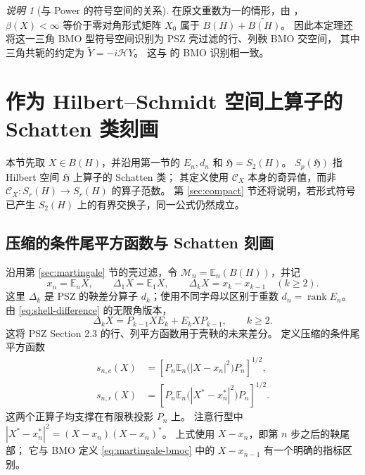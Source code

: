 \documentclass[UTF8,11pt,a4paper,fontset=fandol]{ctexart}
\theoremstyle{remark}
\newtheorem{remark}[theorem]{说明}
\newcommand{\TriH}{\mathcal H}
\newcommand{\CC}{\mathcal C}
\DeclareMathOperator{\rank}{rank}
\newcommand{\HS}{\mathfrak H}
\numberwithin{equation}{section}
\begin{document}
\begin{remark}[与 Power 的符号空间的关系]
在原文重数为一的情形，由 \cite[Theorem 2.3]{Power}，
$\beta(X)<\infty$ 等价于零对角形式矩阵
$X_0$ 属于 $B(H)+\widetilde{B(H)}$。
因此本定理还将这一三角 BMO 型符号空间识别为 PSZ 壳过滤的行、列鞅 BMO 交空间，
其中三角共轭的约定为 $\widetilde Y=-i\TriH Y$。
这与 \cite[Theorem 3.16]{PSZ} 的 BMO 识别相一致。
\end{remark}

\section{作为 Hilbert--Schmidt 空间上算子的 Schatten 类刻画}

本节先取 $X\in B(H)$，并沿用第一节的 $E_n,d_n$ 和 $\HS=S_2(H)$。
$S_p(\HS)$ 指 Hilbert 空间 $\HS$ 上算子的 Schatten 类；
其定义使用 $\CC_X$ 本身的奇异值，而非 $\CC_X:S_r(H)\to S_r(H)$ 的算子范数。
第 \ref{sec:compact} 节还将说明，若形式符号已产生 $S_2(H)$ 上的有界交换子，同一公式仍然成立。

\subsection{压缩的条件尾平方函数与 Schatten 刻画}

沿用第 \ref{sec:martingale} 节的壳过滤，令
$\mathcal M_n=\mathbb E_n(B(H))$，并记
\[
 x_n=\mathbb E_nX,\qquad
 \Delta_1X=\mathbb E_1X,\qquad
 \Delta_kX=x_k-x_{k-1}\quad(k\geq2).
\]
这里 $\Delta_k$ 是 PSZ 的鞅差分算子 $d_k$；使用不同字母以区别于重数
$d_n=\rank E_n$。由 \eqref{eq:shell-difference} 的无限角版本，
\begin{equation}\label{sch:eq:difference}
 \Delta_kX=P_{k-1}XE_k+E_kXP_{k-1},\qquad k\geq2.
\end{equation}
这将 PSZ Section 2.3 的行、列平方函数用于壳鞅的未来差分。
定义压缩的条件尾平方函数
\begin{align}
 s_{n,c}(X)
 &=\left[P_n\mathbb E_n\bigl(|X-x_n|^2\bigr)P_n\right]^{1/2},
       \label{sch:eq:tail-column}\\
 s_{n,r}(X)
 &=\left[P_n\mathbb E_n\bigl(|X^*-x_n^*|^2\bigr)P_n\right]^{1/2}.
       \label{sch:eq:tail-row}
\end{align}
这两个正算子均支撑在有限秩投影 $P_n$ 上。
注意行型中 $|X^*-x_n^*|^2=(X-x_n)(X-x_n)^*$。
上式使用 $X-x_n$，即第 $n$ 步之后的鞅尾部；
它与 BMO 定义 \eqref{eq:martingale-bmoc} 中的 $X-x_{n-1}$ 有一个明确的指标区别。
\end{document}
